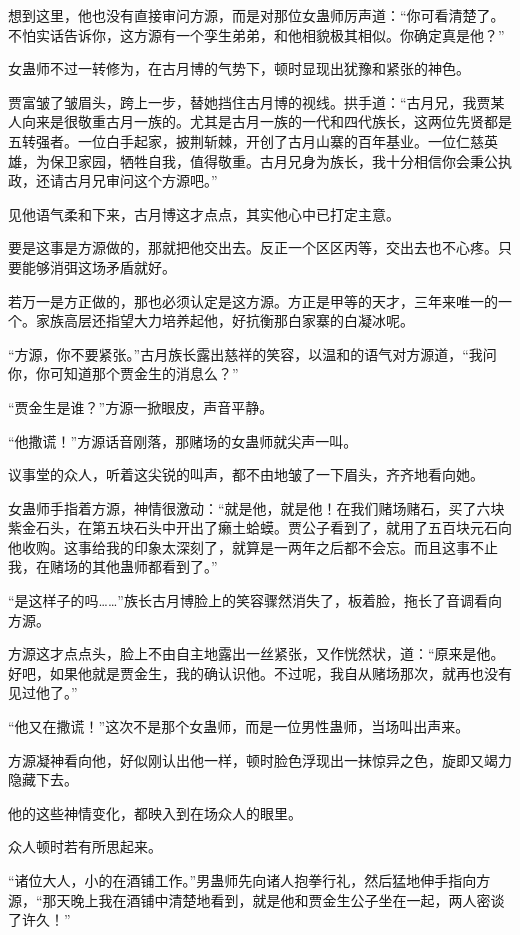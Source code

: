 \begin{this_body}
想到这里，他也没有直接审问方源，而是对那位女蛊师厉声道：“你可看清楚了。不怕实话告诉你，这方源有一个孪生弟弟，和他相貌极其相似。你确定真是他？”

女蛊师不过一转修为，在古月博的气势下，顿时显现出犹豫和紧张的神色。

贾富皱了皱眉头，跨上一步，替她挡住古月博的视线。拱手道：“古月兄，我贾某人向来是很敬重古月一族的。尤其是古月一族的一代和四代族长，这两位先贤都是五转强者。一位白手起家，披荆斩棘，开创了古月山寨的百年基业。一位仁慈英雄，为保卫家园，牺牲自我，值得敬重。古月兄身为族长，我十分相信你会秉公执政，还请古月兄审问这个方源吧。”

见他语气柔和下来，古月博这才点点，其实他心中已打定主意。

要是这事是方源做的，那就把他交出去。反正一个区区丙等，交出去也不心疼。只要能够消弭这场矛盾就好。

若万一是方正做的，那也必须认定是这方源。方正是甲等的天才，三年来唯一的一个。家族高层还指望大力培养起他，好抗衡那白家寨的白凝冰呢。

“方源，你不要紧张。”古月族长露出慈祥的笑容，以温和的语气对方源道，“我问你，你可知道那个贾金生的消息么？”

“贾金生是谁？”方源一掀眼皮，声音平静。

“他撒谎！”方源话音刚落，那赌场的女蛊师就尖声一叫。

议事堂的众人，听着这尖锐的叫声，都不由地皱了一下眉头，齐齐地看向她。

女蛊师手指着方源，神情很激动：“就是他，就是他！在我们赌场赌石，买了六块紫金石头，在第五块石头中开出了癞土蛤蟆。贾公子看到了，就用了五百块元石向他收购。这事给我的印象太深刻了，就算是一两年之后都不会忘。而且这事不止我，在赌场的其他蛊师都看到了。”

“是这样子的吗……”族长古月博脸上的笑容骤然消失了，板着脸，拖长了音调看向方源。

方源这才点点头，脸上不由自主地露出一丝紧张，又作恍然状，道：“原来是他。好吧，如果他就是贾金生，我的确认识他。不过呢，我自从赌场那次，就再也没有见过他了。”

“他又在撒谎！”这次不是那个女蛊师，而是一位男性蛊师，当场叫出声来。

方源凝神看向他，好似刚认出他一样，顿时脸色浮现出一抹惊异之色，旋即又竭力隐藏下去。

他的这些神情变化，都映入到在场众人的眼里。

众人顿时若有所思起来。

“诸位大人，小的在酒铺工作。”男蛊师先向诸人抱拳行礼，然后猛地伸手指向方源，“那天晚上我在酒铺中清楚地看到，就是他和贾金生公子坐在一起，两人密谈了许久！”


\end{this_body}
